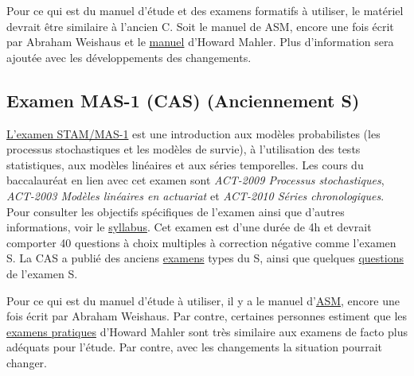 Pour ce qui est du manuel d'étude et des examens formatifs à utiliser, le matériel devrait être similaire à l'ancien C. Soit le manuel de ASM, encore une fois écrit par Abraham Weishaus et le \href{http://howardmahler.com/Teaching/C.html}{manuel} d'Howard Mahler. Plus d'information sera ajoutée avec les développements des changements.\vspace{\baselineskip}





\subsection*{Examen MAS-1 (CAS) (Anciennement S)}\label{subsec:examMAS-1}

\href{http://www.casact.org/admissions/syllabus/index.cfm?fa=MASI&parentID=391}{L'examen STAM/MAS-1} est une introduction aux modèles probabilistes (les processus stochastiques et les modèles de survie), à l'utilisation des tests statistiques, aux modèles linéaires et aux séries temporelles. Les cours du baccalauréat en lien avec cet examen sont \textit{ACT-2009 Processus stochastiques}, \textit{ACT-2003 Modèles linéaires en actuariat} et \textit{ACT-2010 Séries chronologiques}. Pour consulter les objectifs spécifiques de l'examen ainsi que d'autres informations, voir le \href{http://www.casact.org/cms/files/Exam_MAS-I_2018_v20_2017_01_13_2.pdf}{syllabus}. Cet examen est d'une durée de 4h et devrait comporter 40 questions à choix multiples à correction négative comme l'examen S. La CAS a publié des anciens \href{http://www.casact.org/admissions/studytools/examS/}{examens} types du S, ainsi que quelques \href{http://www.casact.org/admissions/studytools/examS/Sample_Questions.pdf}{questions} de l'examen S.\vspace{\baselineskip}

Pour ce qui est du manuel d'étude à utiliser, il y a le manuel d'\href{https://drive.google.com/open?id=0B6kXivc6X9LISGhkVUkzLW5sSnc}{ASM}, encore une fois écrit par Abraham Weishaus. Par contre, certaines personnes estiment que les \href{https://drive.google.com/open?id=0B6kXivc6X9LIOUs3SDF3NmVKNGM}{examens pratiques} d'Howard Mahler sont très similaire aux examens de facto plus adéquats pour l'étude. Par contre, avec les changements la situation pourrait changer. \vspace{\baselineskip}
